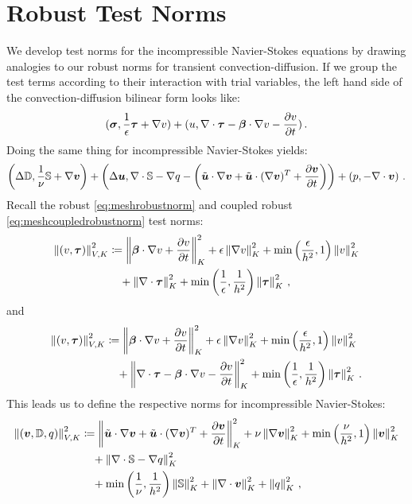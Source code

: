 \documentclass[Dissertation.tex]{subbIles}
\begin{document}
\section{Robust Test Norms}
We develop test norms for the incompressible Navier-Stokes equations by drawing analogies to our
robust norms for transient convection-diffusion. 
If we group the test terms according to their interaction with trial variables, 
the left hand side of the convection-diffusion bilinear form looks like:
\begin{equation*}
  (\boldsymbol\sigma,\frac{1}{\epsilon}\boldsymbol\tau+\nabla v)+(u,\nabla\cdot\boldsymbol\tau-\boldsymbol\beta\cdot\nabla v-\frac{\partial v}{\partial t})\,.
\end{equation*}
Doing the same thing for incompressible Navier-Stokes yields:
\begin{align*}
  \left( \Delta\mathbb{D},\frac{1}{\nu}\mathbb{S}+\nabla\boldsymbol v \right)
  +\left( \Delta\boldsymbol u,\nabla\cdot\mathbb{S}-\nabla q-\left( \tilde{\boldsymbol u}\cdot\nabla\boldsymbol v +\tilde{\boldsymbol u}\cdot(\nabla\boldsymbol v)^T+\frac{\partial\boldsymbol v}{\partial t} \right) \right)
  +\left( p,-\nabla\cdot\boldsymbol v \right)\,.
\end{align*}
Recall the robust \eqref{eq:meshrobustnorm} and coupled robust \eqref{eq:meshcoupledrobustnorm} test norms:
\begin{align*}
\left\| \left( v,\boldsymbol\tau \right) \right\|_{V,K}^2 &\coloneqq
\left\| \boldsymbol\beta\cdot\nabla v+\frac{\partial v}{\partial t} \right\|_K^2
+ \epsilon\left\| \nabla v \right\|_K^2
+ \min\left( \frac{\epsilon}{h^2},1 \right)\left\| v \right\|^2_K
\\\nonumber&\quad
+ \left\| \nabla\cdot \boldsymbol\tau \right\|_K^2
+ \min\left( \frac{1}{\epsilon},\frac{1}{h^2} \right)\left\| \boldsymbol\tau \right\|_K^2\,,
\end{align*}
and
\begin{align*}
\left\| \left( v,\boldsymbol\tau \right) \right\|_{V,K}^2 &\coloneqq
\left\| \boldsymbol\beta\cdot\nabla v+\frac{\partial v}{\partial t} \right\|_K^2
+ \epsilon\left\| \nabla v \right\|_K^2
+ \min\left( \frac{\epsilon}{h^2},1 \right)\left\| v \right\|^2_K
\\\nonumber&\quad
+ \left\| \nabla\cdot \boldsymbol\tau - \boldsymbol\beta\cdot\nabla v-\frac{\partial v}{\partial t} \right\|_K^2
+ \min\left( \frac{1}{\epsilon},\frac{1}{h^2} \right)\left\| \boldsymbol\tau \right\|_K^2\,.
\end{align*}
This leads us to define the respective norms for incompressible Navier-Stokes:
\begin{align*}
\left\| \left( \boldsymbol v,\mathbb{D},q \right) \right\|_{V,K}^2 &\coloneqq
\left\| \tilde{\boldsymbol u}\cdot\nabla\boldsymbol v +\tilde{\boldsymbol u}\cdot(\nabla\boldsymbol v)^T+\frac{\partial\boldsymbol v}{\partial t} \right\|_K^2
+ \nu\left\| \nabla\boldsymbol v \right\|_K^2
+ \min\left( \frac{\nu}{h^2},1 \right)\left\| \boldsymbol v \right\|^2_K
\\\nonumber&\quad
+ \left\| \nabla\cdot\mathbb{S}-\nabla q \right\|_K^2
\\\nonumber&\quad
+ \min\left( \frac{1}{\nu},\frac{1}{h^2} \right)\left\| \mathbb{S} \right\|_K^2
+\left\| \nabla\cdot\boldsymbol v \right\|_K^2
+\left\| q \right\|_K^2
\,,
\end{align*}
\end{document}
